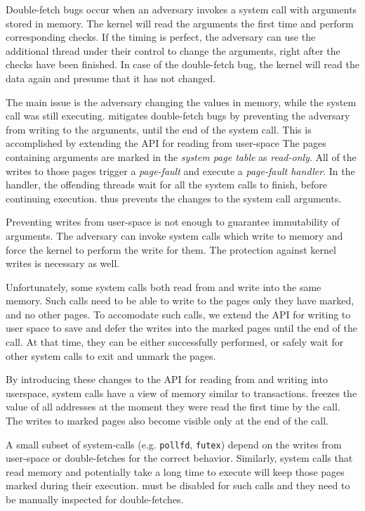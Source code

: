 Double-fetch bugs occur when an adversary invokes a system call with arguments
stored in memory. The kernel will read the arguments the first time and perform
corresponding checks. If the timing is perfect, the adversary can use the
additional thread under their control to change the arguments, right after the
checks have been finished. In case of the double-fetch bug, the kernel
will read the data again and presume that it has not changed.

The main issue is the adversary changing the values in memory, while the system
call was still executing. \sysname mitigates double-fetch bugs by preventing the
adversary from writing to the arguments, until the end of the system call. This
is accomplished by extending the API for reading from user-space The pages
containing arguments are marked in the \emph{system page table} as
\emph{read-only}. All of the writes to those pages trigger a \emph{page-fault}
and execute a \emph{page-fault handler}. In the handler, the offending threads
wait for all the system calls to finish, before continuing execution. \sysname
thus prevents the changes to the system call arguments.

Preventing writes from user-space is not enough to guarantee immutability of arguments.
The adversary can invoke system calls which write to memory and force the kernel
to perform the write for them. The protection against kernel writes is necessary
as well.

Unfortunately, some system calls both read from and write into the same memory.
Such calls need to be able to write to the pages only they have marked, and no
other pages. To accomodate such calls, we extend the API for writing to user
space to save and defer the writes into the marked pages until the end of the
call. At that time, they can be either successfully performed, or safely wait
for other system calls to exit and unmark the pages.

By introducing these changes to the API for reading from and writing into userspace,
system calls have a view of memory similar to transactions. \sysname freezes the
value of all addresses at the moment they were read the first time by the call. 
The writes to marked pages also become visible only at the end of the call. 

A small subset of system-calls (e.g. \texttt{pollfd}, \texttt{futex}) depend on
the writes from user-space or double-fetches for the correct behavior. Similarly,
system calls that read memory and potentially take a long time to execute will
keep those pages marked during their execution. \sysname must be disabled for
such calls and they need to be manually inspected for double-fetches.

